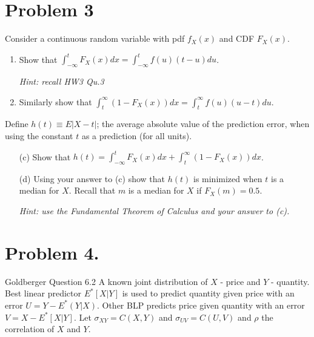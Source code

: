 \documentclass{article}
\newcommand{\1}{\mathbf{1}}
\begin{document}
\newpage
\section*{Problem 3}
Consider a continuous random variable with pdf $f_X(x)$ and CDF $F_X(x)$.
\begin{enumerate}
    \item Show that $\int_{-\infty}^t F_X(x) dx = \int_{-\infty}^t f(u) (t-u) du$.\par {\it Hint: recall HW3 Qu.3}
    
    \item Similarly show that $\int_{t}^\infty (1-F_X(x)) dx = \int_{t}^\infty f(u) (u-t) du$.
\end{enumerate}
Define $h(t) \equiv E|X-t|$; the average absolute value of the prediction error, when using the constant $t$ as a prediction (for all units).
\begin{enumerate}
    \item[(c)] Show that $h(t) =  \int_{-\infty}^t F_X(x) dx + \int_t^\infty(1 - F_X(x))dx$.
    \item[(d)] Using your answer to (c) show that $h(t)$ is minimized when $t$ is a median for $X$. Recall that $m$ is a median for $X$ if $F_X(m) = 0.5$.\par
            {\it Hint: use the Fundamental Theorem of Calculus and your answer to (c).}
\end{enumerate}



\newpage
\section*{Problem 4.} Goldberger Question 6.2
A known joint distribution of $X$ - price and $Y$ - quantity. Best linear predictor $E^*[X|Y]$ is used to predict quantity given price with an error $U = Y-E^*(Y|X)$. Other BLP predicts price given quantity with an error $V = X - E^*[X|Y]$. Let $\sigma_{XY} = C(X,Y)$ and $\sigma_{UV} = C(U,V)$ and $\rho$ the correlation of $X$ and $Y$. 
\end{document}
